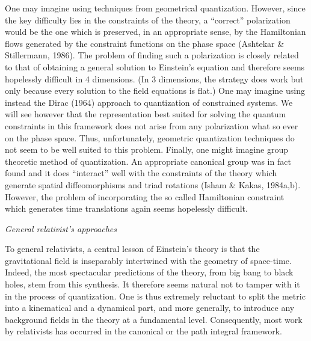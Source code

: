 One may imagine using techniques from geometrical quantization. However,
since the key difficulty lies in the constraints of the theory, a ``correct''
polarization would be the one which is preserved, in an appropriate sense,
by the Hamiltonian flows generated by the constraint functions on the phase
space (Ashtekar \& Stillermann, 1986). The problem of finding such a
polarization is closely related to that of obtaining a general solution to
Einstein's equation and therefore seems hopelessly difficult in 4 dimensions.
(In 3 dimensions, the strategy does work but only because every solution to
the field equations is flat.) One may imagine using instead the Dirac (1964)
approach to quantization of constrained systems. We will see however that the
representation best suited for solving the quantum constraints in this
framework does not arise from any polarization what so ever on the phase
space. Thus, unfortunately, geometric quantization techniques do not seem
to be well suited to this problem. Finally, one might imagine group theoretic
method of quantization. An appropriate canonical group was in fact found and
it does ``interact'' well with the constraints of the theory which generate
spatial diffeomorphisms and triad rotations (Isham \& Kakas, 1984a,b). However,
the problem of incorporating the so called Hamiltonian constraint which
generates time translations again seems hopelessly difficult.
\medbreak

{\sl General relativist's approaches}

To general relativists, a central lesson of Einstein's theory is that
the gravitational field is inseparably intertwined with the geometry of
space-time. Indeed, the most spectacular predictions of the theory, from big
bang to black holes, stem from this synthesis. It therefore seems natural
not to tamper with it in the process of quantization. One is thus extremely
reluctant to split the metric into a kinematical and a dynamical part, and
more generally, to introduce any background fields in the theory at a
fundamental level. Consequently, most work by relativists has occurred in
the canonical or the path integral framework.

